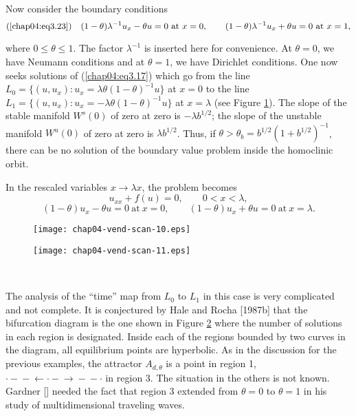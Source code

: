 \documentclass{surv-l}
\theoremstyle{plain}
\theoremstyle{definition}
\numberwithin{equation}{section}
\numberwithin{figure}{chapter}
\begin{document}
Now consider the boundary conditions
\begin{equation*}
(\ref{chap04:eq3.23})\quad (1-\theta)\lambda^{-1}u_{x}-\theta u=0\ \mathrm{at}\ x=0,\qquad (1-\theta)\lambda^{-1}u_{x}+\theta u=0\ \mathrm{at}\ x=1,
\end{equation*}

where $0\leq\theta\leq 1$. The factor $\lambda^{-1}$ is inserted here for convenience. At $\theta=0$, we have Neumann conditions and at $\theta=1$, we have Dirichlet conditions. One now seeks solutions of (\ref{chap04:eq3.17}) which go from the line $L_{0}=\{(u, u_{x}):u_{x}= \lambda\theta(1-\theta)^{-1}u\}$ at $x=0$ to the line $L_{1}=\{(u,u_{x})\!:u_{x}=-\lambda\theta(1-\theta)^{-1}u\}$ at $ x=\lambda$ (see Figure \ref{fig3.8}). The slope of the stable manifold $W^{s}(0)$ of zero at zero is $-\lambda b^{1/2}$; the slope of the unstable manifold $W^{u}(0)$ of zero at zero is $\lambda b^{1/2}$. Thus, if $\theta>\theta_{b}=b^{1/2}(1+b^{1/2})^{-1}$, there can be no solution of the boundary value problem inside the homoclinic orbit.

In the rescaled variables $x\rightarrow\lambda x$, the problem becomes
\begin{equation}\label{chap04:eq3.24}
u_{xx}+f(u)=0, \qquad 0<x<\lambda,
\end{equation}
\begin{equation}\label{chap04:eq3.25}
(1-\theta)u_{x}-\theta u=0\ \mathrm{at}\ x=0, \qquad (1-\theta)u_{x}+\theta u=0\ \mathrm{at}\ x=\lambda.
\end{equation}
\begin{figure}
\texttt{[image: chap04-vend-scan-10.eps]}
\caption{}\label{fig3.8}
\end{figure}

\begin{figure}
\texttt{[image: chap04-vend-scan-11.eps]}
\caption{}\label{fig3.9}
\end{figure}\


The analysis of the ``time'' map from $L_{0}$ to $L_{1}$ in this case is very complicated and not complete. It is conjectured by Hale and Rocha [1987b] that the bifurcation diagram is the one shown in Figure \ref{fig3.9} where the number of solutions in each region is designated. Inside each of the regions bounded by two curves in the diagram, all equilibrium points are hyperbolic. As in the discussion for the previous examples, the attractor $A_{d,\theta}$ is a point in region 1, $\cdot-\!\!\!-\!\!\!\leftarrow\cdot-\!\!\!\rightarrow\!\!\!-\!\!\!-\cdot$ in region 3. The situation in the others is not known. Gardner [\citeyear{1985g}] needed the fact that region 3 extended from $\theta=0$ to $\theta=1$ in his study of multidimensional traveling waves.
\end{document}

